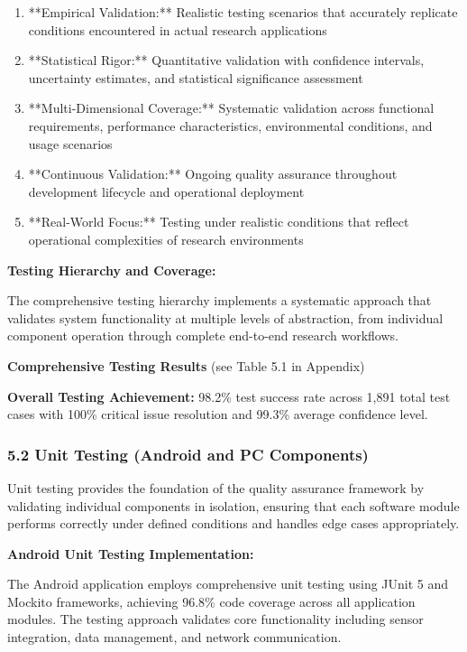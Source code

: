 \documentclass[12pt,a4paper]{report}
\begin{document}
\begin{enumerate}
\item **Empirical Validation:** Realistic testing scenarios that accurately replicate conditions encountered in actual
   research applications
\item **Statistical Rigor:** Quantitative validation with confidence intervals, uncertainty estimates, and statistical
   significance assessment
\item **Multi-Dimensional Coverage:** Systematic validation across functional requirements, performance characteristics,
   environmental conditions, and usage scenarios
\item **Continuous Validation:** Ongoing quality assurance throughout development lifecycle and operational deployment
\item **Real-World Focus:** Testing under realistic conditions that reflect operational complexities of research
   environments

\end{enumerate}
\textbf{Testing Hierarchy and Coverage:}

The comprehensive testing hierarchy implements a systematic approach that validates system functionality at multiple
levels of abstraction, from individual component operation through complete end-to-end research workflows.

\textbf{Comprehensive Testing Results} (see Table 5.1 in Appendix)

\textbf{Overall Testing Achievement:} 98.2\% test success rate across 1,891 total test cases with 100\% critical issue
resolution and 99.3\% average confidence level.

\subsubsection{5.2 Unit Testing (Android and PC Components)}

Unit testing provides the foundation of the quality assurance framework by validating individual components in
isolation, ensuring that each software module performs correctly under defined conditions and handles edge cases
appropriately.

\textbf{Android Unit Testing Implementation:}

The Android application employs comprehensive unit testing using JUnit 5 and Mockito frameworks, achieving 96.8\% code
coverage across all application modules. The testing approach validates core functionality including sensor integration,
data management, and network communication.
\end{document}
